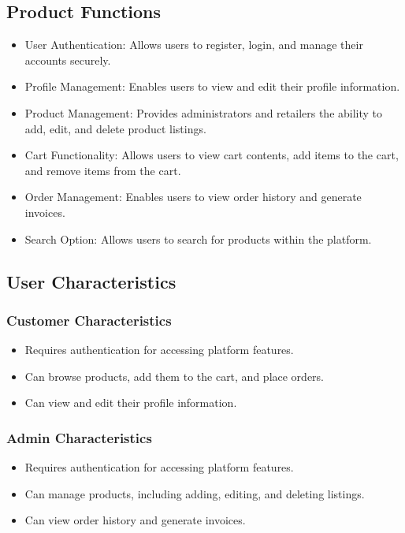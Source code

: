 \documentclass{article}
\begin{document}
\subsection{Product Functions}
\begin{itemize}[label=-]
    \item User Authentication: Allows users to register, login, and manage their accounts securely.
    \item Profile Management: Enables users to view and edit their profile information.
    \item Product Management: Provides administrators and retailers the ability to add, edit, and delete product listings.
    \item Cart Functionality: Allows users to view cart contents, add items to the cart, and remove items from the cart.
    \item Order Management: Enables users to view order history and generate invoices.
    \item Search Option: Allows users to search for products within the platform.
\end{itemize}

\subsection{User Characteristics}
\subsubsection{Customer Characteristics}
\begin{itemize}[label=-]
    \item Requires authentication for accessing platform features.
    \item Can browse products, add them to the cart, and place orders.
    \item Can view and edit their profile information.
\end{itemize}

\subsubsection{Admin Characteristics}
\begin{itemize}[label=-]
    \item Requires authentication for accessing platform features.
    \item Can manage products, including adding, editing, and deleting listings.
    \item Can view order history and generate invoices.
\end{itemize}
\end{document}
